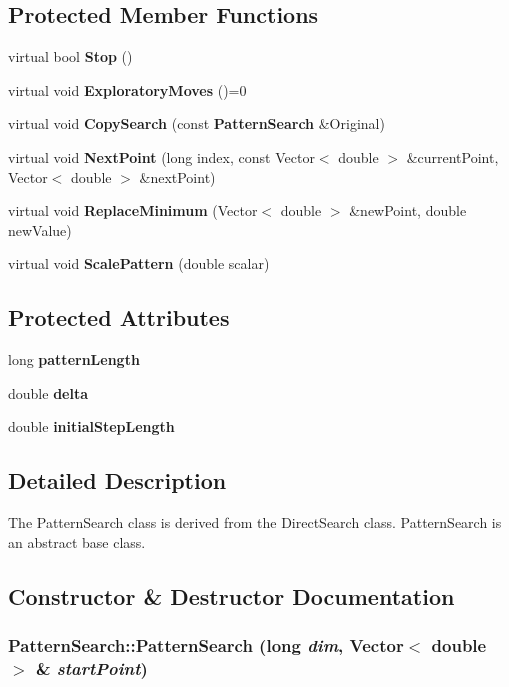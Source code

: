\subsection*{Protected Member Functions}
\begin{CompactItemize}
\item 
virtual bool {\bf Stop} ()
\item 
virtual void {\bf Exploratory\-Moves} ()=0
\item 
virtual void {\bf Copy\-Search} (const {\bf Pattern\-Search} \&Original)
\item 
virtual void {\bf Next\-Point} (long index, const Vector$<$ double $>$ \&current\-Point, Vector$<$ double $>$ \&next\-Point)
\item 
virtual void {\bf Replace\-Minimum} (Vector$<$ double $>$ \&new\-Point, double new\-Value)
\item 
virtual void {\bf Scale\-Pattern} (double scalar)
\end{CompactItemize}
\subsection*{Protected Attributes}
\begin{CompactItemize}
\item 
long {\bf pattern\-Length}
\item 
double {\bf delta}
\item 
double {\bf initial\-Step\-Length}
\end{CompactItemize}


\subsection{Detailed Description}
The Pattern\-Search class is derived from the Direct\-Search class. Pattern\-Search is an abstract base class. 



\subsection{Constructor \& Destructor Documentation}
\subsubsection{\setlength{\rightskip}{0pt plus 5cm}Pattern\-Search::Pattern\-Search (long {\em dim}, Vector$<$ double $>$ \& {\em start\-Point})}\label{classPatternSearch_z15_0}


